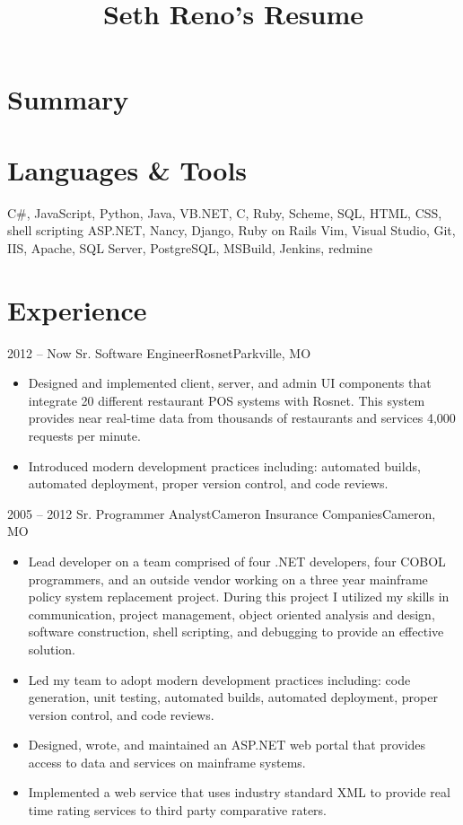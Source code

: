 \documentclass[11pt,letterpaper,final]{moderncv}
\title{Seth Reno's Resume}
\begin{document}
\maketitle
\section{Summary}

\section{Languages \& Tools} 
{C\#, JavaScript, Python, Java, VB.NET, C, Ruby, Scheme, SQL, HTML, CSS, shell scripting}
{ASP.NET, Nancy, Django, Ruby on Rails}
{Vim, Visual Studio, Git, IIS, Apache, SQL Server, PostgreSQL, MSBuild, Jenkins, redmine}

\section{Experience} 
	\cventry
{2012 -- Now} {Sr. Software Engineer}{Rosnet}{Parkville, MO}{}{
		\begin{itemize}
			\item
Designed and implemented client, server, and admin UI components that integrate 20 different
restaurant POS systems with Rosnet. This system provides near real-time data from thousands
of restaurants and services 4,000 requests per minute.
			\item
Introduced modern development practices including: automated builds, automated deployment,
proper version control, and code reviews.
    \end{itemize}
}
	\cventry
{2005 -- 2012} {Sr. Programmer Analyst}{Cameron Insurance Companies}{Cameron, MO}{}{
		\begin{itemize}
			\item 
Lead developer on a team comprised of four .NET developers, four COBOL programmers, and an outside
vendor working on a three year mainframe policy system replacement project. During this project I
utilized my skills in communication, project management, object oriented analysis and design, software
construction, shell scripting, and debugging to provide an effective solution.
			\item 
Led my team to adopt modern development practices including: code generation, unit testing,
automated builds, automated deployment, proper version control, and code reviews.
			\item 
Designed, wrote, and maintained an ASP.NET web portal that provides access to data and services on
mainframe systems.
			\item 
Implemented a web service that uses industry standard XML to provide real time rating services to third
party comparative raters.
		\end{itemize}
}
\end{document}
